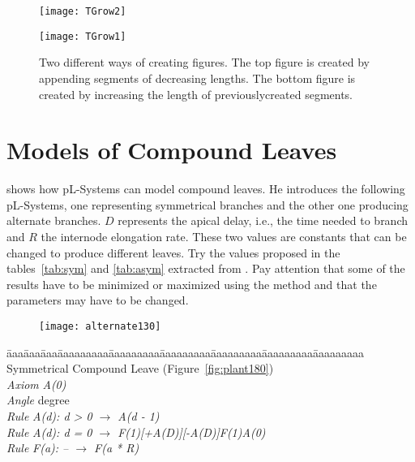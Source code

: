 \begin{figure}[!htbp]
\centerline{\texttt{[image: TGrow2]}}
\centerline{\texttt{[image: TGrow1]}}
\caption{Two different ways of creating figures. The top figure is created by appending segments of decreasing lengths. The bottom figure is created by increasing the length of previouslycreated segments.}
\label{fig:TGrow1}
\end{figure}


















\section{Models of Compound Leaves}

\cite{prus90a} shows how pL-Systems can model compound leaves. 
He introduces the following pL-Systems, one representing symmetrical
branches and the other one producing alternate branches. $D$
represents the apical delay, i.e., the time needed to branch and $R$
the internode elongation rate. These two values are constants that can
be changed to produce different leaves. Try the values proposed in the
tables~\ref{tab:sym} and \ref{tab:asym} extracted from \cite{prus90a}.
Pay attention that some of the results have to be minimized or
maximized using the method  and that the
parameters may have to be changed.

\begin{figure}[!htbp]
\centerline{\texttt{[image: alternate130]}}
\caption{}
\label{fig:alternate}
\end{figure}


\begin{tabbing}
\=aaa\=aaa\=aaa\=aaaaaaaaa\=aaaaaaaaa\=aaaaaaaaa\=aaaaaaaaa\=aaaaaaaaa\=aaaaaaaaa\kill
Symmetrical Compound Leave (Figure~\ref{fig:plant180})\\
\>\>\> \emph{Axiom} \>\>\emph{A(0)}\\
\>\>\> \emph{Angle} \> degree\\
\>\>\> \emph{Rule}  \>\>\emph{A(d): d > 0 $\rightarrow$ A(d - 1)}\\
\>\>\> \emph{Rule}  \>\>\emph{A(d): d = 0 $\rightarrow$ F(1)[+A(D)][-A(D)]F(1)A(0)}\\
\>\>\> \emph{Rule}  \>\>\emph{F(a): -- $\rightarrow$ F(a * R)}
\end{tabbing}

